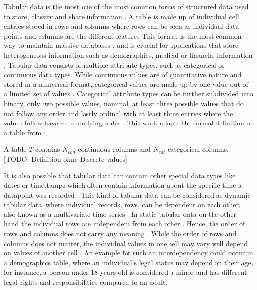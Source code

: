 Tabular data is the most one of the most common forms of structured data \cite{hernandez2022SyntheticDataGeneration} used to store, classify and share information \cite{pilaluisa2022ContextualWordEmbeddings}.
A table is made up of individual cell entries stored in rows and columns where rows can be seen as individual data points and columns are the different features \cite{borisov2022DeepNeuralNetworks, yoon2020VIMEExtendingSuccess}
This format is the most common way to maintain massive databases \cite{esmaeilpour2022BidiscriminatorGANTabular, yoon2020VIMEExtendingSuccess}.
and is crucial for applications that store heterogeneous information such as demographics, medical or financial information \cite{borisov2022DeepNeuralNetworks, yoon2020VIMEExtendingSuccess}.
Tabular data consists of multiple attribute types, such as categorical or continuous data types\cite{borisov2022DeepNeuralNetworks}.
While continuous values are of quantitative nature and stored in a numerical format, categorical values are made up by one value out of a limited set of values \cite{lederrey2022DATGANIntegratingExperta, lane2003IntroductionStatistics}.
Categorical attribute types can be further subdivided into binary, only two possible values, nominal, at least three possible values that do not follow any order and lastly ordinal with at least three entries where the values follow have an underlying order \cite{lederrey2022DATGANIntegratingExperta}.
This work adapts the formal definition of a table from \cite{xu2019ModelingTabularData}:

\begin{displayquote}
A table $T$ contains $N_{con}$ continuous columns and $N_{cat}$ categorical columns. [TODO: Definition ohne Discrete values]
\end{displayquote}

It is also possible that tabular data can contain other special data types like dates or timestamps which often contain information about the specific time a datapoint was recorded \cite{hernandez2022SyntheticDataGeneration}.
This kind of tabular data can be considered as dynamic tabular data, where individual records, \ie rows, can be dependent on each other, also known as a multivariate time series \cite{padhi2021TabularTransformersModeling}.
In static tabular data on the other hand the individual rows are independent from each other \cite{padhi2021TabularTransformersModeling}.
Hence, the order of rows and columns does not carry any meaning \cite{somepalli2021SAINTImprovedNeural}.
While the order of rows and columns does not matter, the individual values in one cell may vary well depend on values of another cell \cite{lederrey2022DATGANIntegratingExperta}.
An example for such an interdependency could occur in a demographics table, where an individual's legal status may depend on their age, 
for instance, a person under 18 years old is considered a minor and has different legal rights and responsibilities compared to an adult.

